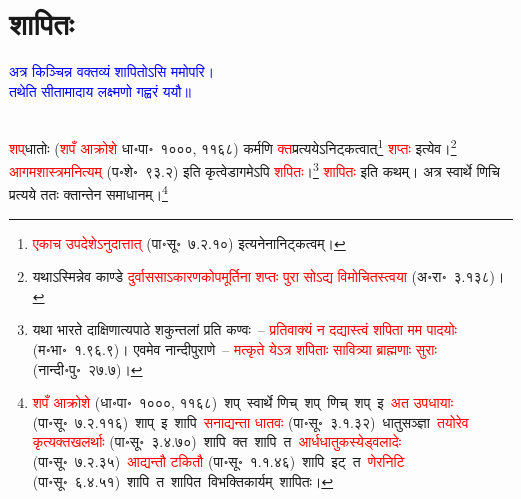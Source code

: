 \section[शापितः]{शापितः}
\centering\textcolor{blue}{अत्र किञ्चिन्न वक्तव्यं शापितोऽसि ममोपरि।\nopagebreak\\
तथेति सीतामादाय लक्ष्मणो गह्वरं ययौ॥}\nopagebreak\\
\\
\begin{sloppypar}\justifying\noindent\hspace{10mm} \textcolor{red}{शप्‌}\-धातोः (\textcolor{red}{शपँ आक्रोशे} धा॰पा॰~१०००, ११६८) कर्मणि \textcolor{red}{क्त}\-प्रत्ययेऽनिट्कत्वात्\footnote{\textcolor{red}{एकाच उपदेशेऽनुदात्तात्‌} (पा॰सू॰~७.२.१०) इत्यनेनानिट्कत्वम्।} \textcolor{red}{शप्तः} इत्येव।\footnote{यथाऽस्मिन्नेव काण्डे \textcolor{red}{दुर्वाससाऽकारणकोपमूर्तिना शप्तः पुरा सोऽद्य विमोचितस्त्वया} (अ॰रा॰~३.१३८)।} \textcolor{red}{आगम\-शास्त्रमनित्यम्} (प॰शे॰~९३.२) इति कृत्वेडागमेऽपि \textcolor{red}{शपितः}।\footnote{यथा भारते दाक्षिणात्य\-पाठे शकुन्तलां प्रति कण्वः~– \textcolor{red}{प्रतिवाक्यं न दद्यास्त्वं शपिता मम पादयोः} (म॰भा॰~१.९६.९)। एवमेव नान्दी\-पुराणे~– \textcolor{red}{मत्कृते येऽत्र शपिताः सावित्र्या ब्राह्मणाः सुराः} (नान्दी॰पु॰~२७.७)।} \textcolor{red}{शापितः} इति कथम्। अत्र स्वार्थे णिचि प्रत्यये ततः क्तान्तेन समाधानम्।\footnote{\textcolor{red}{शपँ आक्रोशे} (धा॰पा॰~१०००, ११६८)~\arrow शप्~\arrow स्वार्थे णिच्~\arrow शप्~णिच्~\arrow शप्~इ~\arrow \textcolor{red}{अत उपधायाः} (पा॰सू॰~७.२.११६)~\arrow शाप्~इ~\arrow शापि~\arrow \textcolor{red}{सनाद्यन्ता धातवः} (पा॰सू॰~३.१.३२)~\arrow धातु\-सञ्ज्ञा~\arrow \textcolor{red}{तयोरेव कृत्य\-क्तखलर्थाः} (पा॰सू॰~३.४.७०)~\arrow शापि~क्त~\arrow शापि~त~\arrow \textcolor{red}{आर्धधातुकस्येड्वलादेः} (पा॰सू॰~७.२.३५)~\arrow \textcolor{red}{आद्यन्तौ टकितौ} (पा॰सू॰~१.१.४६)~\arrow शापि~इट्~त~\arrow \textcolor{red}{णेरनिटि} (पा॰सू॰~६.४.५१)~\arrow शापि~त~\arrow शापित~\arrow विभक्तिकार्यम्~\arrow शापितः।}\end{sloppypar}
